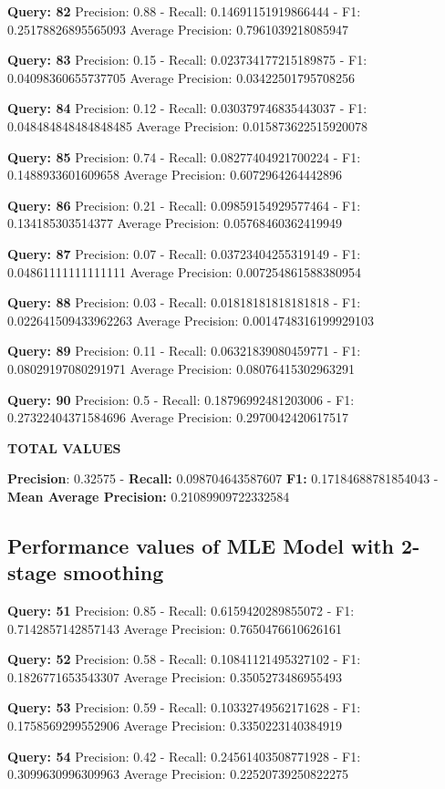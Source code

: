 \documentclass[a4paper, 11pt]{article}
\begin{document}
\textbf{Query: 82}
Precision: 0.88 - Recall: 0.14691151919866444 - F1: 0.25178826895565093 Average Precision: 0.7961039218085947

\textbf{Query: 83}
Precision: 0.15 - Recall: 0.023734177215189875 - F1: 0.04098360655737705 Average Precision: 0.03422501795708256

\textbf{Query: 84}
Precision: 0.12 - Recall: 0.030379746835443037 - F1: 0.048484848484848485 Average Precision: 0.015873622515920078

\textbf{Query: 85}
Precision: 0.74 - Recall: 0.08277404921700224 - F1: 0.1488933601609658 Average Precision: 0.6072964264442896

\textbf{Query: 86}
Precision: 0.21 - Recall: 0.09859154929577464 - F1: 0.134185303514377 Average Precision: 0.05768460362419949

\textbf{Query: 87}
Precision: 0.07 - Recall: 0.03723404255319149 - F1: 0.04861111111111111 Average Precision: 0.007254861588380954

\textbf{Query: 88}
Precision: 0.03 - Recall: 0.01818181818181818 - F1: 0.022641509433962263 Average Precision: 0.0014748316199929103

\textbf{Query: 89}
Precision: 0.11 - Recall: 0.06321839080459771 - F1: 0.08029197080291971 Average Precision: 0.08076415302963291

\textbf{Query: 90}
Precision: 0.5 - Recall: 0.18796992481203006 - F1: 0.27322404371584696 Average Precision: 0.2970042420617517


\textbf{TOTAL VALUES}

\textbf{Precision}: 0.32575 - \textbf{Recall:} 0.098704643587607 \textbf{F1:} 0.17184688781854043 -\textbf{Mean Average Precision:} 0.21089909722332584

\subsection{Performance values of MLE Model with 2-stage smoothing}

\textbf{Query: 51}
Precision: 0.85 - Recall: 0.6159420289855072 - F1: 0.7142857142857143 Average Precision: 0.7650476610626161

\textbf{Query: 52}
Precision: 0.58 - Recall: 0.10841121495327102 - F1: 0.1826771653543307 Average Precision: 0.3505273486955493

\textbf{Query: 53}
Precision: 0.59 - Recall: 0.10332749562171628 - F1: 0.1758569299552906 Average Precision: 0.3350223140384919

\textbf{Query: 54}
Precision: 0.42 - Recall: 0.24561403508771928 - F1: 0.3099630996309963 Average Precision: 0.22520739250822275
\end{document}
